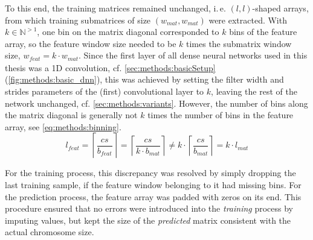 To this end, the training matrices remained unchanged, i.\,e. $(l, l)$-shaped arrays, from which training submatrices of size  $(w_\mathit{mat}, w_\mathit{mat})$
were extracted. 
With $k \in \mathbb{N}^{>1}$, one bin on the matrix diagonal corresponded to $k$ bins of the feature array,
so the feature window size needed to be $k$ times the submatrix window size, $w_\mathit{feat} = k \cdot w_\mathit{mat}$.
Since the first layer of all dense neural networks used in this thesis was a 1D convolution, cf. \cref{sec:methods:basicSetup}  (\cref{fig:methods:basic_dnn}),
this was achieved by setting the filter width and strides parameters of the (first) convolutional layer to $k$, leaving the rest of the network unchanged,
cf. \cref{sec:methods:variants}.
However, the number of bins along the matrix diagonal is generally not $k$ times the number of bins in the feature array,
see \cref{eq:methods:binning}.
\begin{equation}
 l_\mathit{feat} = \left \lceil{\frac{cs}{b_\mathit{feat}}}\right \rceil
                = \left \lceil{\frac{cs}{k \cdot b_\mathit{mat}}}\right \rceil 
                \not = k \cdot \left \lceil{\frac{cs}{ b_\mathit{mat}}}\right \rceil
                = k \cdot l_\mathit{mat} \label{eq:methods:binning}
\end{equation}

For the training process, this discrepancy was resolved by simply dropping the last training sample, 
if the feature window belonging to it had missing bins.
For the prediction process, the feature array was padded with zeros on its end.
This procedure ensured that no errors were introduced into the \emph{training} process by imputing values,
but kept the size of the \emph{predicted} matrix consistent with the actual chromosome size.

